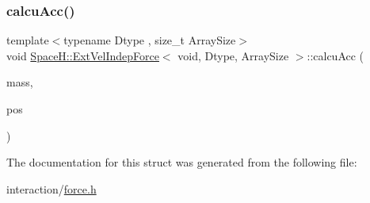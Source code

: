 \mbox{\label{struct_space_h_1_1_ext_vel_indep_force_3_01void_00_01_dtype_00_01_array_size_01_4_a2eaf0655966479362ded7fddc5273008}} 
\subsubsection{\texorpdfstring{calcu\+Acc()}{calcuAcc()}}
{\footnotesize\ttfamily template$<$typename Dtype , size\+\_\+t Array\+Size$>$ \\
void \mbox{\hyperlink{struct_space_h_1_1_ext_vel_indep_force}{Space\+H\+::\+Ext\+Vel\+Indep\+Force}}$<$ void, Dtype, Array\+Size $>$\+::calcu\+Acc (\begin{DoxyParamCaption}\item[{const \mbox{\hyperlink{struct_space_h_1_1_ext_vel_indep_force_3_01void_00_01_dtype_00_01_array_size_01_4_ab186d960b853d69afb7cdbb19af71639}{Scalar\+Array}} \&}]{mass,  }\item[{const \mbox{\hyperlink{struct_space_h_1_1_ext_vel_indep_force_3_01void_00_01_dtype_00_01_array_size_01_4_a2f23924c3395826cf1701b5b0c74be50}{Vector\+Array}} \&}]{pos }\end{DoxyParamCaption})\hspace{0.3cm}{\ttfamily [inline]}}



The documentation for this struct was generated from the following file\+:\begin{DoxyCompactItemize}
\item 
interaction/\mbox{\hyperlink{force_8h}{force.\+h}}\end{DoxyCompactItemize}
